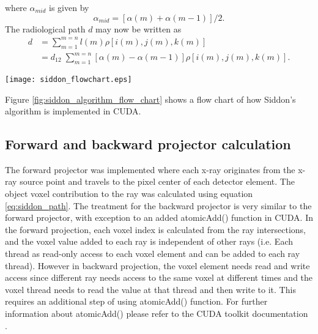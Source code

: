 where $\alpha_{mid}$ is given by 
\begin{equation}
\alpha_{mid} = \left[ \alpha(m) + \alpha(m-1) \right] /2.
\label{eq:siddon_alphamid}
\end{equation}
The radiological path $d$ may now be written as 
\begin{equation}
\begin{aligned}
d &= \sum\limits_{m = 1}^{m = n} l(m) \rho\left[ i(m), j(m), k(m) \right] \\
  &= d_{12} \; \sum\limits_{m = 1}^{m = n} \left[ \alpha(m) - \alpha(m-1) \right] \rho \left[ i(m), j(m), k(m) \right].
\end{aligned}
\label{eq:siddon_path}
\end{equation}

\begin{sidewaysfigure}
\texttt{[image: siddon\_flowchart.eps]}
\caption{A flow chart of Siddon's algorithm implementation on CUDA}
\label{fig:siddon_algorithm_flow_chart}
\end{sidewaysfigure}

Figure \ref{fig:siddon_algorithm_flow_chart} shows a flow chart of how Siddon's algorithm is implemented in CUDA.

\subsection{Forward and backward projector calculation}

The forward projector was implemented where each x-ray originates from the x-ray source point and travels to the pixel center of each detector element.  The object voxel contribution to the ray was calculated using equation \ref{eq:siddon_path}.  The treatment for the backward projector is very similar to the forward projector, with exception to an added atomicAdd() function in CUDA.  In the forward projection, each voxel index is calculated from the ray intersections, and the voxel value added to each ray is independent of other rays (i.e. Each thread as read-only access to each voxel element and can be added to each ray thread).  However in backward projection, the voxel element needs read and write access since different ray needs access to the same voxel at different times and the voxel thread needs to read the value at that thread and then write to it.  This requires an additional step of using atomicAdd() function.  For further information about atomicAdd() please refer to the CUDA toolkit documentation \cite{Cudatoolkit}.  

